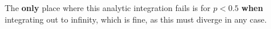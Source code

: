 \documentclass[iop,numberedappendix,apj]{emulateapj}
\begin{document}
The \textbf{only} place where this analytic integration fails is for $p < 0.5$ \textbf{when} integrating out to infinity,
which is fine, as this must diverge in any case. 





\label{references}
\end{document}
